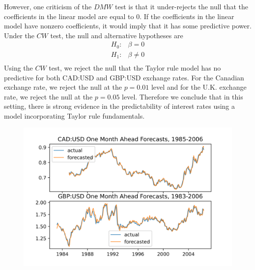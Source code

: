 \documentclass{article}
\begin{document}
However, one criticism of the $DMW$ test is that it under-rejects the null that the coefficients in the linear model are equal to 0. If the coefficients in the linear model have nonzero coefficients, it would imply that it has some predictive power. Under the $CW$ test, the null and alternative hypotheses are
\[\begin{split}
H_0:& \beta = 0 \\
H_1:& \beta \neq 0 \\
\end{split}\]
Using the $CW$ test, we reject the null that the Taylor rule model has no predictive for both CAD:USD and GBP:USD exchange rates. For the Canadian exchange rate, we reject the null at the $p=0.01$ level and for the U.K. exchange rate, we reject the null at the $p=0.05$ level. Therefore we conclude that in this setting, there is strong evidence in the predictability of interest rates using a model incorporating Taylor rule fundamentals.

\begin{figure}
\centering
\includegraphics{forecasts.png}
\end{figure}
\end{document}
